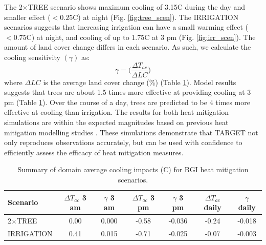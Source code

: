 \documentclass[gmd, manuscript]{copernicus}
\begin{document}
The 2$\times$TREE scenario  shows maximum cooling of  3.15\degree C during the day and smaller effect ($< 0.25$\degree C) at night (Fig. \ref{fig:tree_scen}).  The IRRIGATION scenarios suggests that increasing irrigation can have a small warming effect ($< 0.75$\degree C) at night, and  cooling of up to  1.75\degree C at 3 pm (Fig. \ref{fig:irr_scen}).  The amount of  land cover change differs in each scenario. As such, we calculate the cooling sensitivity $(\gamma)$ as:
\begin{equation}
\gamma = \big(\frac{\Delta T_{ac}}{\Delta LC}\big)
\end{equation}where $\Delta LC$ is the average land cover change (\%) (Table \ref{tab:cooling_scen}). Model results suggests that trees  are about 1.5 times more effective at providing cooling at 3 pm (Table \ref{tab:cooling_scen}). Over the course of a day, trees are predicted to be 4 times more effective at cooling than irrigation. The results for both heat mitigation simulations are  within the expected magnitudes based on previous heat mitigation modelling studies \citep{grossman2010,middel2015urban,daniel2016,Broadbent}. These simulations demonstrate that TARGET not only reproduces observations accurately, but can be used with confidence to efficiently assess the efficacy of heat mitigation measures.   

\begin{table}
\begin{center}
\caption{Summary of domain average cooling impacts (\degree C) for BGI heat mitigation scenarios.}
\label{tab:cooling_scen}
\begin{tabular}{l | c c | c c | c c}
\hline
Scenario & $\Delta T_{ac}$ 3 am & $\gamma$ 3 am & $\Delta T_{ac}$ 3 pm &  $\gamma$ 3 pm & $\Delta T_{ac}$ daily  & $\gamma$ daily \\
\hline
2$\times$TREE & 0.00 & 0.000 & -0.58 & -0.036 & -0.24 & -0.018   \\
IRRIGATION    & 0.41  & 0.015 & -0.71 & -0.025 & -0.07 & -0.003  \\
\hline
\end{tabular}

\end{center}
\end{table}
\end{document}
